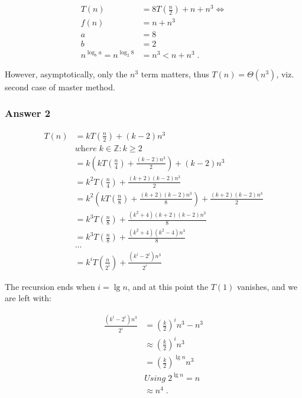 \documentclass[11pt]{article}
\begin{document}
\begin{align*}
  T(n) &= 8T\left(\frac{n}{2}\right) + n + n^3 \iff \\
  f(n) &= n + n^3 \\
  a &= 8 \\
  b &= 2 \\
  n^{\log_b a} = n^{\log_2 8} &= n^3 < n + n^3\;.
\end{align*}

However, asymptotically, only the \(n^3\) term matters, thus \(T(n) =
    \Theta(n^3)\), viz. second case of master method.

\subsubsection{Answer 2}
\label{sec:orgheadline2}

\begin{align*}
  T(n) &= kT\left(\frac{n}{2}\right) + (k - 2)n^3 \\
       &\textit{where}\; k \in \mathbb{Z}: k \geq 2 \\
       &= k\left(kT\left(\frac{n}{4}\right) + \frac{(k - 2)n^3}{2}\right) + (k - 2)n^3 \\
       &= k^2T\left(\frac{n}{4}\right) + \frac{(k + 2)(k - 2)n^3}{2} \\
       &= k^2\left(kT\left(\frac{n}{8}\right) + \frac{(k + 2)(k - 2)n^3}{8}\right) + \frac{(k + 2)(k - 2)n^3}{2} \\
       &= k^3T\left(\frac{n}{8}\right) + \frac{(k^2 + 4)(k + 2)(k - 2)n^3}{8} \\
       &= k^3T\left(\frac{n}{8}\right) + \frac{(k^2 + 4)(k^2 - 4)n^3}{8} \\
       &\dots \\
       &= k^iT\left(\frac{n}{2^i}\right) + \frac{(k^i - 2^i)n^3}{2^i}
\end{align*}

The recursion ends when \(i = \lg n\), and at this point the \(T(1)\) vanishes,
and we are left with:

\begin{align*}
   \frac{(k^i - 2^i)n^3}{2^i} &= \left(\frac{k}{2}\right)^in^3 - n^3 \\
   &\approx \left(\frac{k}{2}\right)^in^3 \\
   &= \left(\frac{k}{2}\right)^{\lg n}n^3 \\
   &\textit{Using}\; 2^{\lg n} = n \\
   &\approx n^4\;.
\end{align*}
\end{document}
